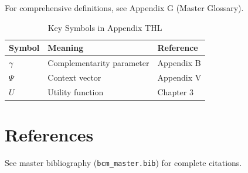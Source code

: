 For comprehensive definitions, see Appendix G (Master Glossary).

\begin{table}[htbp]
\centering
\caption{Key Symbols in Appendix THL}
\begin{tabular}{lll}
\toprule
\textbf{Symbol} & \textbf{Meaning} & \textbf{Reference} \\
\midrule
$\gamma$ & Complementarity parameter & Appendix B \\
$\Psi$ & Context vector & Appendix V \\
$U$ & Utility function & Chapter 3 \\
\bottomrule
\end{tabular}
\end{table}


\section{References}
\label{sec:thl-references}

See master bibliography (\texttt{bcm\_master.bib}) for complete citations.

\nocite{bcm_master}

